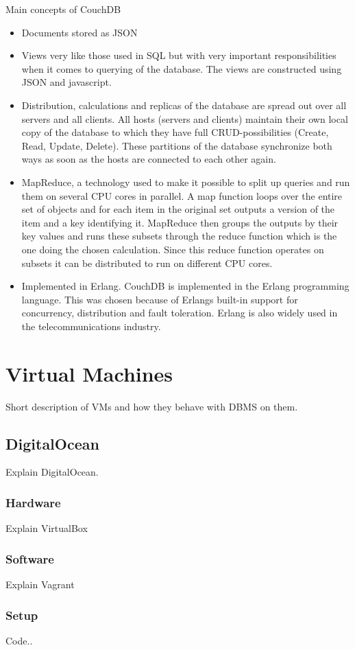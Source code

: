Main concepts of CouchDB
\begin{itemize}
  \item Documents stored as JSON
  \item Views very like those used in SQL but with very important responsibilities when it comes to querying of the database. The views are constructed using JSON and javascript. 
  \item Distribution, calculations and replicas of the database are spread out over all servers and all clients. All hosts (servers and clients) maintain their own local copy of the database to which they have full CRUD-possibilities (Create, Read, Update, Delete).
  These partitions of the database synchronize both ways as soon as the hosts are connected to each other again.
  \item MapReduce, a technology used to make it possible to split up queries and run them on several CPU cores in parallel. A map function loops over the entire set of objects and for each item in the original set outputs a version of the item and a key identifying it. MapReduce then groups the outputs by their key values and runs these subsets through the reduce function which is the one doing the chosen calculation. Since this reduce function operates on subsets it can be distributed to run on different CPU cores. 
  \item Implemented in Erlang. CouchDB is implemented in the Erlang programming language. This was chosen because of Erlangs built-in support for concurrency, distribution and fault toleration. Erlang is also widely used in the telecommunications industry. 
\end{itemize}

\section{Virtual Machines}
Short description of VMs and how they behave with DBMS on them.
\subsection{DigitalOcean} 
Explain DigitalOcean.
\subsubsection{Hardware}
Explain VirtualBox
\subsubsection{Software} 
Explain Vagrant
\subsubsection{Setup} 
Code..
